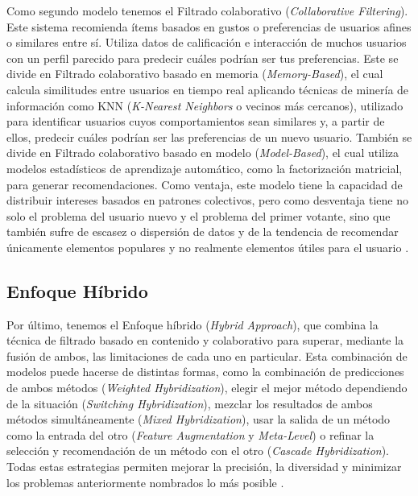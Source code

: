 Como segundo modelo tenemos el Filtrado colaborativo (\emph{Collaborative Filtering}). Este sistema recomienda ítems basados en gustos o preferencias de usuarios afines o similares entre sí. Utiliza datos de calificación e interacción de muchos usuarios con un perfil parecido para predecir cuáles podrían ser tus preferencias. Este se divide en Filtrado colaborativo basado en memoria (\emph{Memory-Based}), el cual calcula similitudes entre usuarios en tiempo real aplicando técnicas de minería de información como KNN (\emph{K-Nearest Neighbors} o vecinos más cercanos), utilizado para identificar usuarios cuyos comportamientos sean similares y, a partir de ellos, predecir cuáles podrían ser las preferencias de un nuevo usuario. También se divide en Filtrado colaborativo basado en modelo (\emph{Model-Based}), el cual utiliza modelos estadísticos de aprendizaje automático, como la factorización matricial, para generar recomendaciones. Como ventaja, este modelo tiene la capacidad de distribuir intereses basados en patrones colectivos, pero como desventaja tiene no solo el problema del usuario nuevo y el problema del primer votante, sino que también sufre de escasez o dispersión de datos y de la tendencia de recomendar únicamente elementos populares y no realmente elementos útiles para el usuario \parencite{ShahEtAl2016, KoEtAl2022}.

\subsection{Enfoque Híbrido}\label{subsec:enfoque_hibrido}

Por último, tenemos el Enfoque híbrido (\emph{Hybrid Approach}), que combina la técnica de filtrado basado en contenido y colaborativo para superar, mediante la fusión de ambos, las limitaciones de cada uno en particular. Esta combinación de modelos puede hacerse de distintas formas, como la combinación de predicciones de ambos métodos (\emph{Weighted Hybridization}), elegir el mejor método dependiendo de la situación (\emph{Switching Hybridization}), mezclar los resultados de ambos métodos simultáneamente (\emph{Mixed Hybridization}), usar la salida de un método como la entrada del otro (\emph{Feature Augmentation} y \emph{Meta-Level}) o refinar la selección y recomendación de un método con el otro (\emph{Cascade Hybridization}). Todas estas estrategias permiten mejorar la precisión, la diversidad y minimizar los problemas anteriormente nombrados lo más posible \parencite{ShahEtAl2016, KoEtAl2022}.

